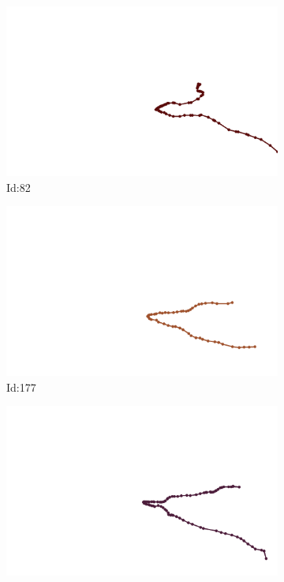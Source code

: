 \documentclass[12pt,twoside]{report}
\begin{document}
\begin{figure}
\centering
\begin{subfigure}[b]{0.20\textwidth}
\centering
\includegraphics[width=\textwidth]{../../trajectories/82.png}
\caption{Id:82}
\end{subfigure}
\begin{subfigure}[b]{0.20\textwidth}
\centering
\includegraphics[width=\textwidth]{../../trajectories/177.png}
\caption{Id:177}
\end{subfigure}
\begin{subfigure}[b]{0.20\textwidth}
\centering
\includegraphics[width=\textwidth]{../../trajectories/501.png}

\end{subfigure}
\end{figure}
\end{document}
